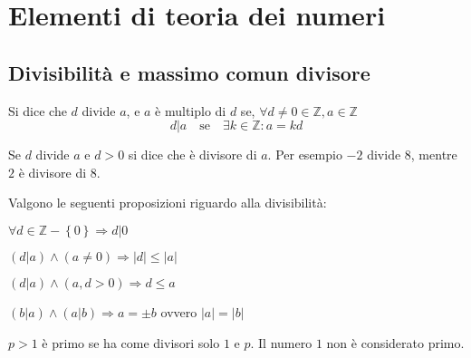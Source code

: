 \section{Elementi di teoria dei numeri}

\subsection{Divisibilità e massimo comun divisore}

\begin{definition}[Divisibilità]
    \label{def:divisibilita}
    Si dice che $d$ divide $a$, e $a$ è multiplo di $d$ se,
    $
    \forall d \ne 0 \in \mathbb{Z}
    ,
    a \in \mathbb{Z}
    $
    \begin{equation*}
        d | a 
        \quad
        \text{se}
        \quad
        \exists k \in \mathbb{Z} : a = kd
    \end{equation*}
\end{definition}
\begin{definition}[Divisore]
    \label{def:divisore}
    Se $d$ divide $a$ e $d>0$ si dice che è divisore di $a$.
    Per esempio $-2$ divide $8$, mentre $2$ è divisore di $8$.
\end{definition}
Valgono le seguenti proposizioni riguardo alla divisibilità:
\begin{proposizione}
    $\forall d \in \mathbb{Z} - \left\{ 0 \right\}
    \Rightarrow
    d | 0$
\end{proposizione}
\begin{proposizione}
    $
    \left( d | a \right)
    \wedge
    \left( a \ne 0 \right)
    \Rightarrow
    |d| \leq |a|
    $
\end{proposizione}
\begin{corollario}
    \label{cor:divisore_limite}
    $
    \left( d | a \right)
    \wedge
    \left( a,d > 0 \right)
    \Rightarrow
    d \leq a
    $
\end{corollario}
\begin{proposizione}
    $
    \left( b | a \right)
    \wedge
    \left( a | b \right)
    \Rightarrow
    a = \pm b
    $ ovvero $
    |a| = |b|
    $
\end{proposizione}
\begin{definition}
    \label{def:numeroprimo}
    $p > 1$ è primo se ha come divisori solo $1$ e $p$. Il numero $1$ non è considerato primo.
\end{definition}
